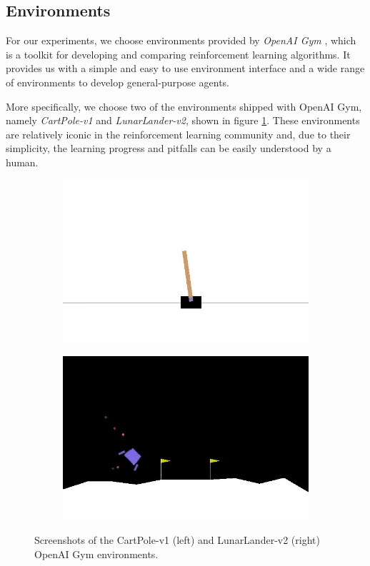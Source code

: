 \subsection{Environments}
For our experiments, we choose environments provided by \textit{OpenAI Gym} \cite{gym}, which is a toolkit for developing and comparing reinforcement learning algorithms. It provides us with a simple and easy to use environment interface and a wide range of environments to develop general-purpose agents.

More specifically, we choose two of the environments shipped with OpenAI Gym, namely \textit{CartPole-v1} and \textit{LunarLander-v2}, shown in figure \ref{fig:environments}. These environments are relatively iconic in the reinforcement learning community and, due to their simplicity, the learning progress and pitfalls can be easily understood by a human.
\begin{figure}[ht]
    \centering
    \begin{subfigure}{0.49\textwidth}
        \raggedleft
        \includegraphics[width=\textwidth]{assets/cartpole.jpg}
    \end{subfigure}
    \begin{subfigure}{0.5\textwidth}
        \raggedright
        \includegraphics[width=\textwidth]{assets/lunarlander.jpg}
    \end{subfigure}
    \caption{Screenshots of the CartPole-v1 (left) and LunarLander-v2 (right) OpenAI Gym environments.}
    \label{fig:environments}
\end{figure}
